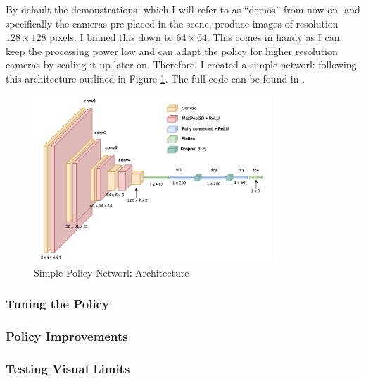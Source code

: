 \noindent By default the demonstrations -which I will refer to as ``demos'' from now on- and specifically the cameras pre-placed in the scene, produce images of resolution $128 \times 128$ pixels. I binned this down to $64 \times 64$. This comes in handy as I can keep the processing power low and can adapt the policy for higher resolution cameras by scaling it up later on. Therefore, I created a simple network following this architecture outlined in Figure \ref{fig:policy-arch}. The full code can be found in .

\begin{figure}[h]
  \centering
  \includegraphics[width=0.8\textwidth]{assets/early-work/cnn-encoder-policy-head.png}
  \caption{Simple Policy Network Architecture}\label{fig:policy-arch}
\end{figure}


\subsubsection{Tuning the Policy}

\subsubsection{Policy Improvements}



\subsubsection{Testing Visual Limits}


